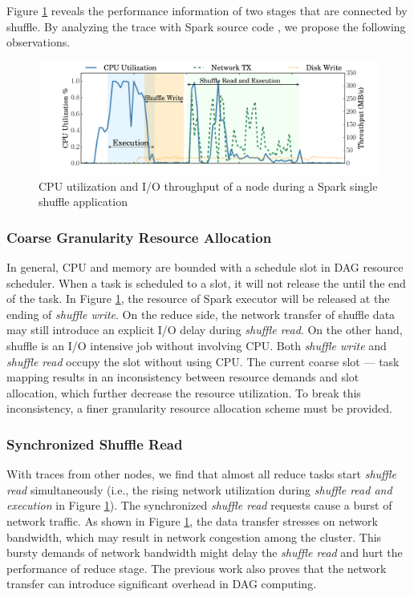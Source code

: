Figure \ref{fig:util} reveals the performance information of two stages that are connected by shuffle. By analyzing the trace with Spark source code \cite{sparksource}, we propose the following observations.

\begin{figure}
	\includegraphics[width=\linewidth]{fig/util}
	\caption{CPU utilization and I/O throughput of a node during a Spark single shuffle application}
	\label{fig:util}
\end{figure}

\subsubsection{Coarse Granularity Resource Allocation}
In general, CPU and memory are bounded with a schedule slot in DAG resource scheduler. When a task is scheduled to a slot, it will not release the until the end of the task. In Figure \ref{fig:util}, the resource of Spark executor will be released at the ending of \textit{shuffle write}. On the reduce side, the network transfer of shuffle data may still introduce an explicit I/O delay during \textit{shuffle read}. On the other hand, shuffle is an I/O intensive job without involving CPU. Both \textit{shuffle write} and \textit{shuffle read} occupy the slot without using CPU. The current coarse slot --- task mapping results in an inconsistency between resource demands and slot allocation, which further decrease the resource utilization. To break this inconsistency, a finer granularity resource allocation scheme must be provided.

\subsubsection{Synchronized Shuffle Read}
With traces from other nodes, we find that almost all reduce tasks start \textit{shuffle read} simultaneously (i.e., the rising network utilization during \textit{shuffle read and execution} in Figure \ref{fig:util}). The synchronized \textit{shuffle read} requests cause a burst of network traffic. As shown in Figure \ref{fig:util}, the data transfer stresses on network bandwidth, which may result in network congestion among the cluster. This bursty demands of network bandwidth might delay the \textit{shuffle read} and hurt the performance of reduce stage. The previous work \cite{coflow, managing} also proves that the network transfer can introduce significant overhead in DAG computing.

